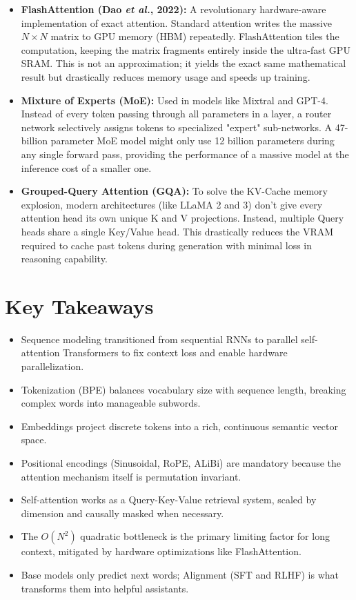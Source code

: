 \documentclass[11pt, a4paper]{article}
\begin{document}
\begin{itemize}[leftmargin=*]
  \item \textbf{FlashAttention (Dao \textit{et al.}, 2022):} A revolutionary hardware-aware implementation of exact attention. Standard attention writes the massive $N \times N$ matrix to GPU memory (HBM) repeatedly. FlashAttention tiles the computation, keeping the matrix fragments entirely inside the ultra-fast GPU SRAM. This is not an approximation; it yields the exact same mathematical result but drastically reduces memory usage and speeds up training.
  \item \textbf{Mixture of Experts (MoE):} Used in models like Mixtral and GPT-4. Instead of every token passing through all parameters in a layer, a router network selectively assigns tokens to specialized "expert" sub-networks. A 47-billion parameter MoE model might only use 12 billion parameters during any single forward pass, providing the performance of a massive model at the inference cost of a smaller one.
  \item \textbf{Grouped-Query Attention (GQA):} To solve the KV-Cache memory explosion, modern architectures (like LLaMA 2 and 3) don't give every attention head its own unique K and V projections. Instead, multiple Query heads share a single Key/Value head. This drastically reduces the VRAM required to cache past tokens during generation with minimal loss in reasoning capability.
\end{itemize}

\section*{Key Takeaways}
\begin{itemize}[leftmargin=*]
  \item Sequence modeling transitioned from sequential RNNs to parallel self-attention Transformers to fix context loss and enable hardware parallelization.
  \item Tokenization (BPE) balances vocabulary size with sequence length, breaking complex words into manageable subwords.
  \item Embeddings project discrete tokens into a rich, continuous semantic vector space.
  \item Positional encodings (Sinusoidal, RoPE, ALiBi) are mandatory because the attention mechanism itself is permutation invariant.
  \item Self-attention works as a Query-Key-Value retrieval system, scaled by dimension and causally masked when necessary.
  \item The $O(N^2)$ quadratic bottleneck is the primary limiting factor for long context, mitigated by hardware optimizations like FlashAttention.
  \item Base models only predict next words; Alignment (SFT and RLHF) is what transforms them into helpful assistants.
\end{itemize}
\end{document}
